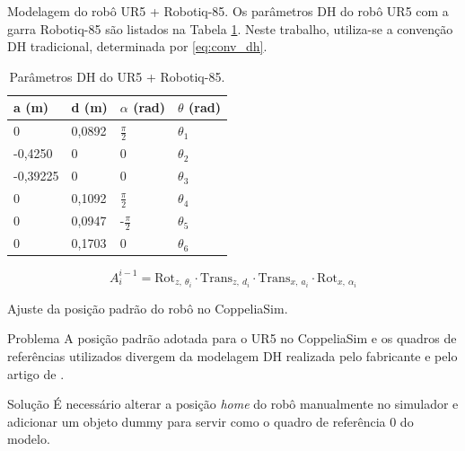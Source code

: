 \documentclass[xcolor=dvipsnames,aspectratio=169]{beamer}
\begin{document}
\begin{frame}{Modelagem do robô UR5 + Robotiq-85.}
    \justifying
    Os parâmetros DH do robô UR5 com a garra Robotiq-85 são listados na Tabela \ref{tab:params_dh_garra}. Neste trabalho, utiliza-se a convenção DH tradicional, determinada por \eqref{eq:conv_dh}.

    \begin{table}[h]
        \centering
        \caption{Parâmetros DH do UR5 + Robotiq-85.}
        \label{tab:params_dh_garra}
        \begin{tabular}{|l|l|l|l|}
            \hline
            a (m)    & d (m)  & \(\alpha\) (rad)   & \(\theta\) (rad) \\ \hline
            0        & 0,0892 & \(\frac{\pi}{2}\)  & \(\theta_1\)     \\ \hline
            -0,4250  & 0      & 0                  & \(\theta_2\)     \\ \hline
            -0,39225 & 0      & 0                  & \(\theta_3\)     \\ \hline
            0        & 0,1092 & \(\frac{\pi}{2}\)  & \(\theta_4\)     \\ \hline
            0        & 0,0947 & -\(\frac{\pi}{2}\) & \(\theta_5\)     \\ \hline
            0        & 0,1703 & 0                  & \(\theta_6\)     \\ \hline
        \end{tabular}
    \end{table}

    \begin{equation}
        A_{i}^{i-1} = \mathrm{Rot}_{z,\ \theta_i} \cdot \mathrm{Trans}_{z,\ d_i} \cdot \mathrm{Trans}_{x,\ a_i} \cdot \mathrm{Rot}_{x,\ \alpha_i}
        \label{eq:conv_dh}
    \end{equation}
\end{frame}

\begin{frame} {Ajuste da posição padrão do robô no CoppeliaSim.}
    \begin{alertblock}{Problema}
        A posição padrão adotada para o UR5 no CoppeliaSim e os quadros de referências utilizados divergem da modelagem DH realizada pelo fabricante e pelo artigo de \cite{Keating2014}.
    \end{alertblock}

    \begin{block}{Solução}
        É necessário alterar a posição \textit{home} do robô manualmente no simulador e adicionar um objeto dummy para servir como o quadro de referência 0 do modelo.
    \end{block}
\end{frame}
\end{document}
